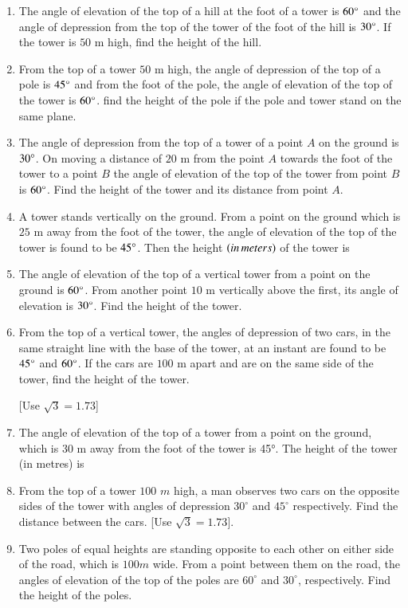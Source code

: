 \begin{enumerate}[label=\thesubsection.\arabic*.,ref=\thesubsection.\theenumi]
\hfill{}\item The angle of elevation of the top of a hill at the foot of a tower is $60\degree$ and the angle of depression from the top of the tower of the foot of the hill is $30\degree$. If the tower is $50\text{ m}$ high, find the height of the hill. 
\hfill{}\item From the top of a tower $50\text{ m}$ high, the angle of depression of the top of a pole is $45\degree$ and from the foot of the pole, the angle of elevation of the top of the tower is $60\degree$. find the height of the pole if the pole and tower stand on the same plane. 
\hfill{}\item The angle of depression from the top of a tower of a point $A$ on the ground is $30\degree$. On moving a distance of $20\text{ m}$ from the point $A$ towards the foot of the tower to a point $B$ the angle of elevation of the top of the tower from point $B$ is $60\degree$. Find the height of the tower and its distance from point $A$.
\hfill{}
\item A tower stands vertically on the ground. From a point on the ground which is $25$ m away from the foot of the tower, the angle of elevation of the top of the tower is found to be $45\degree$. Then the height $\left(in\,meters\right)$ of the tower is



\hfill{}\item The angle of elevation of the top of a vertical tower from a point on the ground is $60\degree$. From another point $10$ m vertically above the first, its angle of elevation is $30\degree$. Find the height of the tower.


\hfill{}\item From the top of a vertical tower, the angles of depression of two cars, in the same straight line with the base of the tower, at an instant are found to be $45\degree$ and $60\degree$. If the cars are $100$ m apart and are on the same side of the tower, find the height of the tower. 

[Use $\sqrt{3} = 1.73$]
\hfill{}
    \item The angle of elevation of the top of a tower from a point on the ground, which is 30 m away from the foot of the tower is 45°. The height of the tower (in metres) is
    \hfill{}\item From the top of a tower $100$ $m$ high, a man observes two cars on the opposite sides of the tower with angles of depression $30^\circ$ and $45^\circ$ respectively. Find the distance between the cars. [Use $\sqrt{3}=1.73$].
    \hfill{}\item Two poles of equal heights are standing opposite to each other on either side of the road, which is $100m$ wide. From a point between them on the road, the angles of elevation of the top of the poles are $60^\circ$ and $30^\circ$, respectively. Find the height of the poles.
\hfill{}


\end{enumerate}
